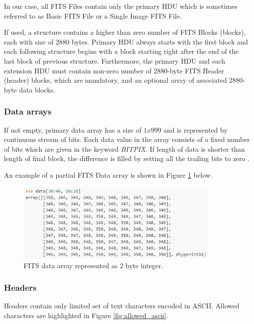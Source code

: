 	In our case, all FITS Files contain only the primary HDU which is sometimes referred to as Basic FITS File or a Single Image FITS File.
	
	If used, a structure contains a higher than zero number of FITS Blocks (blocks), each with size of 2880 bytes. Primary HDU always starts with the first block and each following structure begins with a block starting right after the end of the last block of previous structure. Furthermore, the primary HDU and each extension HDU must contain non-zero number of 2880-byte FITS Header (header) blocks, which are mandatory, and an optional array of associated 2880-byte data blocks\citep{FITSdefinition}.
	
\subsubsection{Data arrays} 
	
	If not empty, primary data array has a size of $1 x 999$ and is represented by continuous stream of bits. Each data value in the array consists of a fixed number of bits which are given in the keyword \emph{BITPIX}. If length of data is shorter than length of final block, the difference is filled by setting all the trailing bits to zero \citep{FITSdefinition}.
	
	An example of a partial FITS Data array is shown in Figure \ref{fig:fits_data_array} below.
	
	\begin{figure}[H]
	\centering
	  \includegraphics[width=10cm]{images/fits_data_array}
		  \caption{FITS data array represented as 2 byte integer.}
	  \label{fig:fits_data_array}
	\end{figure}
	
\subsubsection{Headers}

	Headers contain only limited set of text characters encoded in ASCII. Allowed characters are highlighted in Figure \ref{fig:allowed_ascii}.
	
